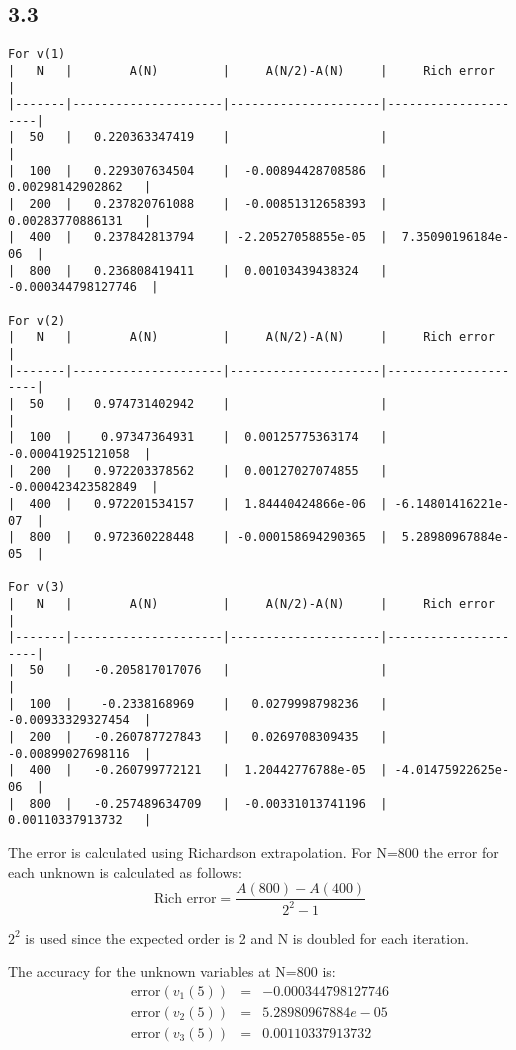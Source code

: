 \documentclass{article}
\begin{document}
\subsection*{3.3}
\begin{verbatim}
For v(1)
|   N   |        A(N)         |     A(N/2)-A(N)     |     Rich error      |
|-------|---------------------|---------------------|---------------------|
|  50   |   0.220363347419    |                     |                     |
|  100  |   0.229307634504    |  -0.00894428708586  |  0.00298142902862   |
|  200  |   0.237820761088    |  -0.00851312658393  |  0.00283770886131   |
|  400  |   0.237842813794    | -2.20527058855e-05  |  7.35090196184e-06  |
|  800  |   0.236808419411    |  0.00103439438324   | -0.000344798127746  |

For v(2)
|   N   |        A(N)         |     A(N/2)-A(N)     |     Rich error      |
|-------|---------------------|---------------------|---------------------|
|  50   |   0.974731402942    |                     |                     |
|  100  |    0.97347364931    |  0.00125775363174   |  -0.00041925121058  |
|  200  |   0.972203378562    |  0.00127027074855   | -0.000423423582849  |
|  400  |   0.972201534157    |  1.84440424866e-06  | -6.14801416221e-07  |
|  800  |   0.972360228448    | -0.000158694290365  |  5.28980967884e-05  |

For v(3)
|   N   |        A(N)         |     A(N/2)-A(N)     |     Rich error      |
|-------|---------------------|---------------------|---------------------|
|  50   |   -0.205817017076   |                     |                     |
|  100  |    -0.2338168969    |   0.0279998798236   |  -0.00933329327454  |
|  200  |   -0.260787727843   |   0.0269708309435   |  -0.00899027698116  |
|  400  |   -0.260799772121   |  1.20442776788e-05  | -4.01475922625e-06  |
|  800  |   -0.257489634709   |  -0.00331013741196  |  0.00110337913732   |
\end{verbatim}

The error is calculated using Richardson extrapolation. For N=800 the error for each unknown is calculated as follows:
$$
\text{Rich error}=\frac{A(800)-A(400)}{2^2-1}
$$

$2^2$ is used since the expected order is 2 and N is doubled for each iteration.

The accuracy for the unknown variables at N=800 is:
$$\begin{array}{rcl}
  \text{error}(v_1(5))&=&-0.000344798127746\\
  \text{error}(v_2(5))&=&5.28980967884e-05\\
  \text{error}(v_3(5))&=&0.00110337913732\\
\end{array}$$
\end{document}
